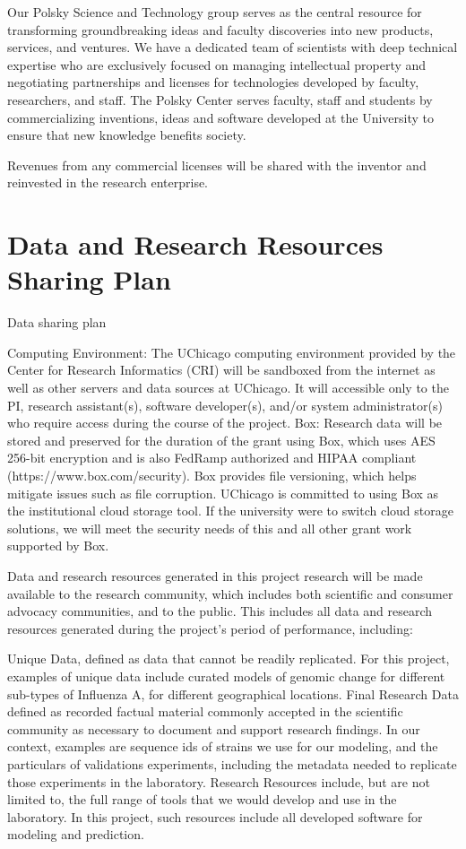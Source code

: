 \documentclass[onecolumn, compsoc,12pt]{IEEEtran}
\begin{document}
Our Polsky Science and Technology group serves as the central resource for transforming groundbreaking ideas and faculty discoveries into new products, services, and ventures. We have a dedicated team of scientists with deep technical expertise who are exclusively focused on managing intellectual property and negotiating partnerships and licenses for technologies developed by faculty, researchers, and staff. The Polsky Center serves faculty, staff and students by commercializing inventions, ideas and software developed at the University to ensure that new knowledge benefits society. 

Revenues from any commercial licenses will be shared with the inventor and reinvested in the research enterprise.



\clearpage

\section*{Data and Research Resources Sharing Plan}
        Data sharing plan

              Computing Environment: The UChicago computing environment provided by the Center for Research Informatics (CRI) will be sandboxed from the internet as well as other servers and data sources at UChicago. It will accessible only to the PI, research assistant(s), software developer(s), and/or system administrator(s) who require access during the course of the project.
Box: Research data will be stored and preserved for the duration of the grant using Box, which uses AES 256-bit encryption and is also FedRamp authorized and HIPAA compliant (https://www.box.com/security). Box provides file versioning, which helps mitigate issues such as file corruption. UChicago is committed to using Box as the institutional cloud storage tool. If the university were to switch cloud storage solutions, we will meet the security needs of this and all other grant work supported by Box.


              Data and research resources generated in this project research will be made available to the research community, which includes both scientific and consumer advocacy communities, and to the public. This includes all data and research resources generated during the project’s period of performance, including:

Unique Data, defined as data that cannot be readily replicated. For this project, examples of unique data include curated models of genomic change for different sub-types of Influenza A, for different geographical locations.
Final Research Data defined as recorded factual material commonly accepted in the scientific community as necessary to document and support research findings. In our context, examples are sequence ids of strains we use for our modeling, and the particulars of validations experiments, including the metadata needed to replicate those experiments in the laboratory.
Research Resources include, but are not limited to, the full range of tools that we would develop and use in the laboratory. In this project, such resources include all developed software for modeling and prediction.
\end{document}
